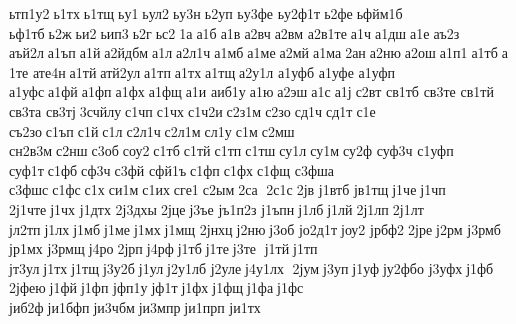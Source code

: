 ьтп1у2 ь1тх ь1тщ ьу1 ьул2 ьу3н ь2уп 	ьу3фе 
ьу2ф1т ь2фе ьфйм1б 	ьф1тб ь2ж ьи2 ьип3 ь2г ьс2 1а а1б а1в а2вч а2вм 
а2в1те а1ч а1дш а1е аъ2з 	аъй2л а1ъп а1й а2йдбм а1л а2л1ч а1мб а1ме а2мй а1ма 2ан а2ню а2ош а1п1 а1тб а1те 	ате4н а1тй атй2ул а1тп а1тх а1тщ а2у1л 	а1уфб 	а1уфе 	а1уфп 	а1уфс а1фй а1фп а1фх а1фщ а1и 	аиб1у а1ю а2эш а1с а1ј с2вт 	св1тб 	св3те 	св1тй 	св3та 	св3тј 3счйлу с1чп с1чх с1ч2и с2з1м с2зо сд1ч сд1т с1е 	съ2зо с1ъп с1й с1л с2л1ч с2л1м сл1у с1м с2мш 
сн2в3м с2нш с3об соу2 с1тб с1тй с1тп с1тш су1л су1м су2ф 	суф3ч 	с1уфп 	суф1т с1фб сф3ч с3фй 	сфй1ъ с1фп с1фх с1фщ 	с3фша 	с3фшс с1фс с1х си1м с1их сге1 с2ым 2са  2с1с 2јв 	ј1втб 	јв1тщ ј1че ј1чп 
2ј1чте ј1чх 	ј1дтх 
2ј3дхы 2јце ј3ъе 
јъ1п2з 	ј1ъпн ј1лб ј1лй 2ј1лп 2ј1лт 	јл2тп ј1лх ј1мб ј1ме ј1мх ј1мщ 	2јнхц ј2ню ј3об 
јо2д1т јоу2 	јрбф2 2јре ј2рм 	ј3рмб 	јр1мх 	ј3рмщ ј4ро 2јрп ј4рф ј1тб ј1те ј3те  ј1тй ј1тп 	јт3ул ј1тх ј1тщ ј3у2б ј1ул ј2у1лб  	ј2уле ј4у1лх  2јум ј3уп ј1уф ју2фбо 	ј3уфх ј1фб 	2јфею ј1фй ј1фп 	јфп1у јф1т ј1фх ј1фщ ј1фа ј1фс 	јиб2ф ји1бфп ји3чбм ји3мпр ји1прп 	ји1тх